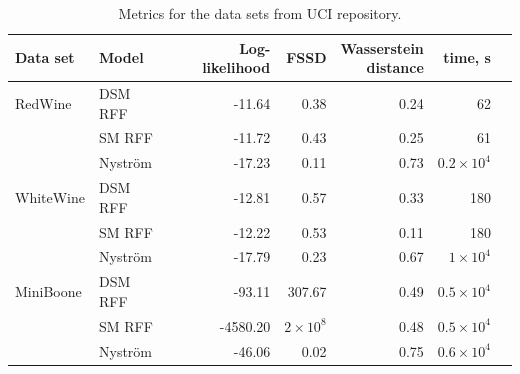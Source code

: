 \begin{table}
\centering
\caption{Metrics for the data sets from UCI repository.}
\label{tab:metrics}
  \footnotesize
  \begin{tabular}{llrrrrr}
    \toprule
    Data set & Model & Log-likelihood & FSSD &
    \shortstack{Wasserstein \\ distance} & time, s \\
    \midrule
    RedWine & DSM RFF     & -11.64 & 0.38 & 0.24 & 62 \\
            & SM RFF      & -11.72 & 0.43 & 0.25 & 61 \\
            & Nystr\"om   & -17.23 & 0.11 & 0.73 & $0.2 \times 10^4$ \\
    WhiteWine & DSM RFF   & -12.81 & 0.57 & 0.33 & 180 \\
              & SM RFF    & -12.22 & 0.53 & 0.11 & 180 \\
              & Nystr\"om & -17.79 & 0.23 & 0.67 & $1 \times 10^4$ \\
    MiniBoone & DSM RFF   & -93.11 & 307.67 & 0.49 & $0.5 \times 10^4$ \\
              & SM RFF    & -4580.20 & $2 \times 10^8$ & 0.48 & $0.5 \times 10^4$ \\
              & Nystr\"om & -46.06 & 0.02 &  0.75 & $0.6 \times 10^4$ \\
    \bottomrule
  \end{tabular}
\end{table}





